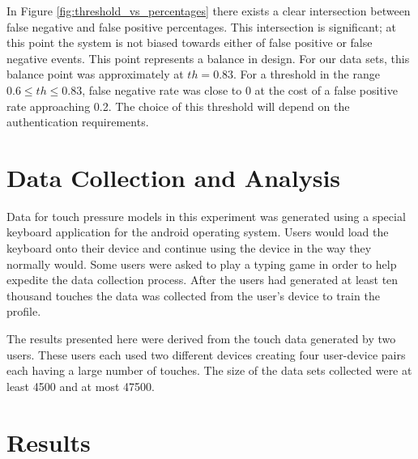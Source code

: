 \documentclass{acm_proc_article-sp}
\begin{document}
In Figure \ref{fig:threshold_vs_percentages} there exists a clear intersection between false negative and false positive percentages. This intersection is significant; at this point the system is not biased towards
either of false positive or false negative events. This point represents a balance in design. For our
data sets, this balance point was approximately at $th=0.83$. For a threshold in the range
$0.6 \leq th \leq 0.83$, false negative rate was close to 0 at the cost of a false positive rate approaching 0.2.
The choice of this threshold will depend on the authentication requirements.




\section{Data Collection and Analysis}
\label{sec:data_collection}
Data for touch pressure models in this experiment was generated using a special keyboard application for the android operating system. Users would load the keyboard onto their device and continue using the device in the way they normally would. Some users were asked to play a typing game in order to help expedite the data collection process. After the users had generated at least ten thousand touches the data was collected from the user's device to train the profile.

The results presented here were derived from the touch data generated by two users. These users each used two different devices creating four user-device pairs each having a large number of touches.
The size of the data sets collected were at least 4500 and at most 47500.



\section{Results}
\label{sec:results}
\end{document}

